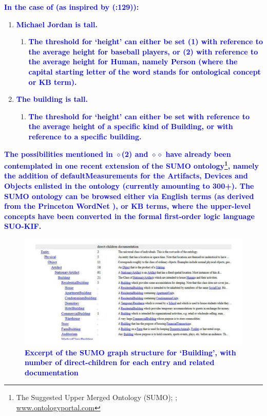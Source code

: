 \documentclass[11pt]{article}
\begin{document}
\textbf{\textcolor{blue}{In the case of (as inspired by (\cite{kennedy1999scalar}:129)):}}

\begin{enumerate}[resume]
\item \textbf{\textcolor{blue}{Michael Jordan is tall. \label{ex:jordan}}}
\begin{enumerate}[label=$\diamond$]
\item \textbf{\textcolor{blue}{The threshold for `height' can either be set (1) with reference to the average height for baseball players, or (2) with reference to the average height for Human, namely Person (where the capital starting letter of the word stands for ontological concept or KB term).}}
\end{enumerate}
\item \textbf{\textcolor{blue}{The building is tall. \label{ex:building}}}
\begin{enumerate}[label=$\diamond$$\diamond$]
\item \textbf{\textcolor{blue}{The threshold for `height' can either be set with reference to the average height of a specific kind of Building, or with reference to a specific building.}}
\end{enumerate}
\end{enumerate}

\textbf{\textcolor{blue}{The possibilities mentioned in $\diamond$(2) and $\diamond$$\diamond$ have already been contemplated in one recent extension of the SUMO ontology\footnote{The Suggested Upper Merged Ontology (SUMO); \cite{nilespease2001sumo}; \url{www.ontologyportal.com}}, namely the addition of defaultMeasurements for the Artifacts, Devices and Objects enlisted in the ontology (currently amounting to 300+). The SUMO ontology can be browsed either via English terms (as derived from the Princeton WordNet \textregistered), or KB terms, where the upper-level concepts have been converted in the formal first-order logic language SUO-KIF.}}


\begin{figure}[h!]
\includegraphics[width=\textwidth]{building_SUMO1}
\caption{\textbf{\textcolor{blue}{Excerpt of the SUMO graph structure for `Building', with number of direct-children for each entry and related documentation}}}\label{building_SUMO}
\end{figure}
\end{document}
